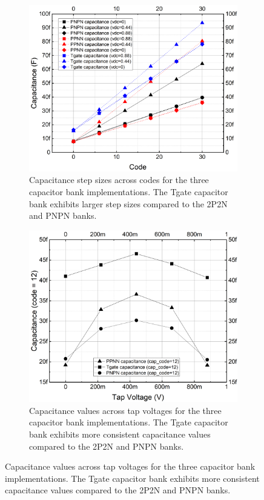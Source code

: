 \begin{figure}[H]
  \begin{subfigure}[t]{0.45\linewidth}
    \centering
    \includegraphics[width=\linewidth]{figures/Results/Cap_tests-CapVsCode.png}
    \caption{Capacitance step sizes across codes for the three capacitor bank implementations. The Tgate capacitor bank exhibits larger step sizes compared to the 2P2N and PNPN banks.}
    \label{fig:cap_vs_codes}
  \end{subfigure}
  \hfill
  \begin{subfigure}[t]{0.45\linewidth}
    \centering
    \includegraphics[width=\linewidth]{figures/Results/Cap_tests-CapVsVoltage.png}
    \caption{Capacitance values across tap voltages for the three capacitor bank implementations. The Tgate capacitor bank exhibits more consistent capacitance values compared to the 2P2N and PNPN banks.}
    \label{fig:cap_vs_tap_voltage}
  \end{subfigure}
\end{figure}

